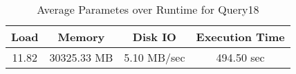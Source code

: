 \documentclass[../../main.tex]{subfiles}
\begin{document}
    \begin{table}
        \begin{center}
            \begin{tabular}{ |c|c|c|c| } 
            \hline
            Load & Memory & Disk IO & Execution Time\\
            \hline
            11.82 & 30325.33 MB & 5.10 MB/sec & 494.50 sec \\
            \hline
            \end{tabular}
            \\[1pt]
            \caption{Average Parametes over Runtime for Query18}
        \end{center}
    \end{table}
    \pagebreak
\end{document}
